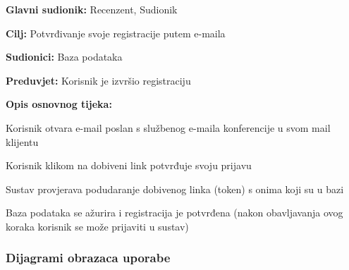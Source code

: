 				\begin{packed_item}
					\item \textbf{Glavni sudionik:} Recenzent, Sudionik
					\item \textbf{Cilj:} Potvrđivanje svoje registracije putem e-maila
					\item \textbf{Sudionici:} Baza podataka
					\item \textbf{Preduvjet:} Korisnik je izvršio registraciju
					
					\item \textbf{Opis osnovnog tijeka:} 
					\item[] \begin{packed_enum}
						
						\item Korisnik otvara e-mail poslan s službenog e-maila konferencije u svom mail klijentu
						\item Korisnik klikom na dobiveni link potvrđuje svoju prijavu
						\item Sustav provjerava podudaranje dobivenog linka (token) s onima koji su u bazi
						\item Baza podataka se ažurira i registracija je potvrđena 
						(nakon obavljavanja ovog koraka korisnik se može prijaviti u sustav)
						
						
					\end{packed_enum}
				\end{packed_item}
					

				\pagebreak

					
					
					
				
					
				\subsubsection{Dijagrami obrazaca uporabe}
					
